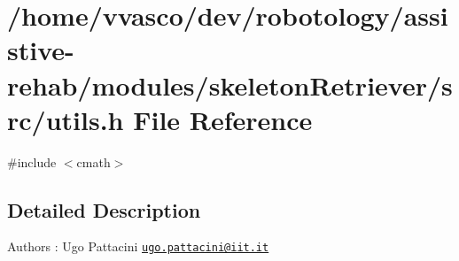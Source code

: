 \section{/home/vvasco/dev/robotology/assistive-\/rehab/modules/skeleton\+Retriever/src/utils.h File Reference}
\label{utils_8h}
{\ttfamily \#include $<$cmath$>$}\newline


\subsection{Detailed Description}
\begin{DoxyAuthor}{Authors}
\+: Ugo Pattacini \href{mailto:ugo.pattacini@iit.it}{\tt ugo.\+pattacini@iit.\+it} 
\end{DoxyAuthor}
